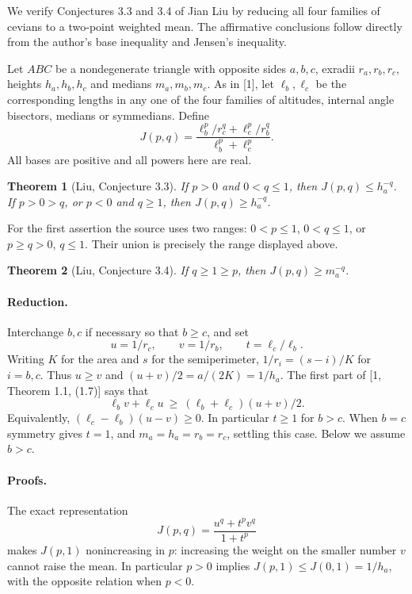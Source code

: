 \documentclass[11pt,a4paper]{article}
\numberwithin{equation}{section}
\newtheorem{theorem}{Theorem}[section]
\theoremstyle{definition}
\theoremstyle{remark}
\newenvironment{sectionabstract}{\par\smallskip\begingroup\small\noindent}{\par\endgroup\medskip}
\begin{document}
\begin{sectionabstract}
We verify Conjectures 3.3 and 3.4 of Jian Liu by reducing all four families of cevians to a two-point weighted mean. The affirmative conclusions follow directly from the author's base inequality and Jensen's inequality.
\end{sectionabstract}

Let $ABC$ be a nondegenerate triangle with opposite sides $a,b,c$, exradii $r_a,r_b,r_c$, heights $h_a,h_b,h_c$ and medians $m_a,m_b,m_c$. As in [1], let $\ell_b,\ell_c$ be the corresponding lengths in any one of the four families of altitudes, internal angle bisectors, medians or symmedians. Define
\[
 J(p,q)=\frac{\ell_b^p/r_c^q+\ell_c^p/r_b^q}{\ell_b^p+\ell_c^p}.
\]
All bases are positive and all powers here are real.
\begin{theorem}[Liu, Conjecture 3.3]\label{r37keio:t:33}
If $p>0$ and $0<q\le1$, then $J(p,q)\le h_a^{-q}$. If $p>0>q$, or $p<0$ and $q\ge1$, then $J(p,q)\ge h_a^{-q}$.
\end{theorem}
For the first assertion the source uses two ranges: $0<p\le1$, $0<q\le1$, or $p\ge q>0$, $q\le1$. Their union is precisely the range displayed above.
\begin{theorem}[Liu, Conjecture 3.4]\label{r37keio:t:34}
If $q\ge1\ge p$, then $J(p,q)\ge m_a^{-q}$.
\end{theorem}
\paragraph{Reduction.}
Interchange $b,c$ if necessary so that $b\ge c$, and set
\[
 u=1/r_c,\qquad v=1/r_b,\qquad t=\ell_c/\ell_b .
\]
Writing $K$ for the area and $s$ for the semiperimeter, $1/r_i=(s-i)/K$ for $i=b,c$. Thus $u\ge v$ and $(u+v)/2=a/(2K)=1/h_a$. The first part of [1, Theorem 1.1, (1.7)] says that
\[
       \ell_b v+\ell_c u\ \ge\ (\ell_b+\ell_c)(u+v)/2 .
\]
Equivalently, $(\ell_c-\ell_b)(u-v)\ge0$. In particular $t\ge1$ for $b>c$. When $b=c$ symmetry gives $t=1$, and $m_a=h_a=r_b=r_c$, settling this case. Below we assume $b>c$.


\paragraph{Proofs.}
The exact representation
\[
 J(p,q)=\frac{u^q+t^p v^q}{1+t^p}
\]
makes $J(p,1)$ nonincreasing in $p$: increasing the weight on the smaller number $v$ cannot raise the mean. In particular $p>0$ implies $J(p,1)\le J(0,1)=1/h_a$, with the opposite relation when $p<0$.
\end{document}
